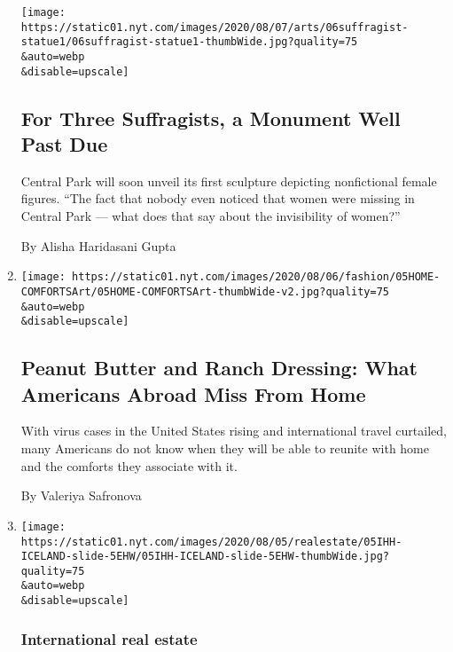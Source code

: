 \begin{enumerate}
  \texttt{[image: https://static01.nyt.com/images/2020/08/07/arts/06suffragist-statue1/06suffragist-statue1-thumbWide.jpg?quality=75\\\&auto=webp\\\&disable=upscale]}

  \hypertarget{for-three-suffragists-a-monument-well-past-due}{%
  \subsection{For Three Suffragists, a Monument Well Past
  Due}\label{for-three-suffragists-a-monument-well-past-due}}

  Central Park will soon unveil its first sculpture depicting
  nonfictional female figures. ``The fact that nobody even noticed that
  women were missing in Central Park --- what does that say about the
  invisibility of women?''

  By Alisha Haridasani Gupta
\item
  \href{/2020/08/05/style/american-comfort-foods-peanut-butter-ranch-dressing-hot-cheetos.html}{}

  \texttt{[image: https://static01.nyt.com/images/2020/08/06/fashion/05HOME-COMFORTSArt/05HOME-COMFORTSArt-thumbWide-v2.jpg?quality=75\\\&auto=webp\\\&disable=upscale]}

  \hypertarget{peanut-butter-and-ranch-dressing-what-americans-abroad-miss-from-home}{%
  \subsection{Peanut Butter and Ranch Dressing: What Americans Abroad
  Miss From
  Home}\label{peanut-butter-and-ranch-dressing-what-americans-abroad-miss-from-home}}

  With virus cases in the United States rising and international travel
  curtailed, many Americans do not know when they will be able to
  reunite with home and the comforts they associate with it.

  By Valeriya Safronova
\item
  \href{/2020/08/05/realestate/house-hunting-in-iceland-a-lakeside-summer-house-for-773000.html}{}

  \texttt{[image: https://static01.nyt.com/images/2020/08/05/realestate/05IHH-ICELAND-slide-5EHW/05IHH-ICELAND-slide-5EHW-thumbWide.jpg?quality=75\\\&auto=webp\\\&disable=upscale]}

  \hypertarget{international-real-estate}{%
  \subsubsection{International real
  estate}\label{international-real-estate}}


\end{enumerate}

